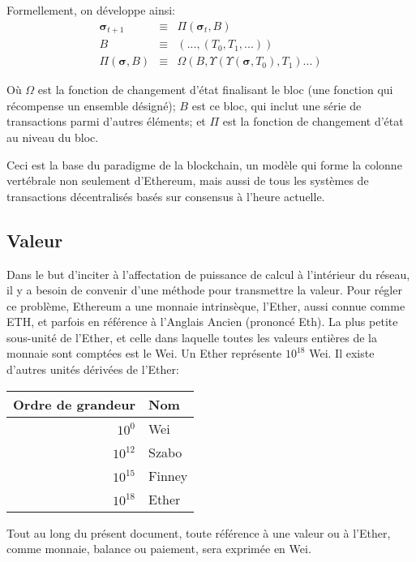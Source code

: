 \documentclass[9pt,oneside]{amsart}
\begin{document}
\begin{multicols}{2}
Formellement, on développe ainsi:
\begin{eqnarray}
\boldsymbol{\sigma}_{t+1} & \equiv & \Pi(\boldsymbol{\sigma}_t, B) \\
B & \equiv & (..., (T_0, T_1, ...) ) \\
\Pi(\boldsymbol{\sigma}, B) & \equiv & \Omega(B, \Upsilon(\Upsilon(\boldsymbol{\sigma}, T_0), T_1) ...)
\end{eqnarray}


Où $\Omega$ est la fonction de changement d'état finalisant le bloc (une fonction qui récompense un ensemble désigné); $B$ est ce bloc, qui inclut une série de transactions parmi d'autres éléments; et $\Pi$ est la fonction de changement d'état au niveau du bloc.

Ceci est la base du paradigme de la blockchain, un modèle qui forme la colonne vertébrale non seulement d'Ethereum, mais aussi de tous les systèmes de transactions décentralisés basés sur consensus à l'heure actuelle.

\subsection{Valeur}


Dans le but d'inciter à l’affectation de puissance de calcul à l'intérieur du réseau, il y a besoin de convenir d'une méthode pour transmettre la valeur. Pour régler ce problème, Ethereum a une monnaie intrinsèque, l'Ether, aussi connue comme {\small ETH}, et parfois en référence à l'Anglais Ancien \DH{} (prononcé Eth). La plus petite sous-unité de l'Ether, et celle dans laquelle toutes les valeurs entières de la monnaie sont comptées est le Wei. Un Ether représente $10^{18}$ Wei. Il existe d'autres unités dérivées de l'Ether:
\par
\begin{center}
\begin{tabular}{rl}
\toprule
Ordre de grandeur & Nom \\
\midrule
$10^0$ & Wei \\
$10^{12}$ & Szabo \\
$10^{15}$ & Finney \\
$10^{18}$ & Ether \\
\bottomrule
\end{tabular}
\end{center}
\par

Tout au long du présent document, toute référence à une valeur ou à l'Ether, comme monnaie, balance ou paiement, sera exprimée en Wei.


\end{multicols}
\end{document}
